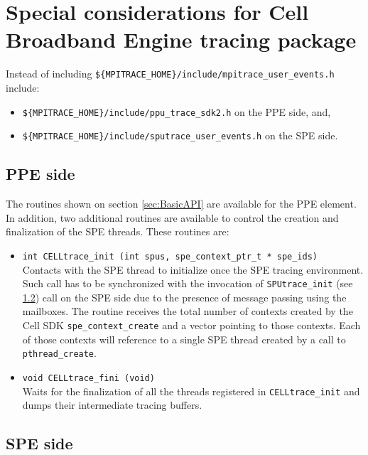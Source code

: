 \section{Special considerations for Cell Broadband Engine tracing package}

Instead of including {\tt \$\{MPITRACE\_HOME\}/include/mpitrace\_user\_events.h} include:
\begin{itemize}
 \item {\tt \$\{MPITRACE\_HOME\}/include/ppu\_trace\_sdk2.h} on the PPE side, and,
 \item {\tt \$\{MPITRACE\_HOME\}/include/sputrace\_user\_events.h} on the SPE side.
\end{itemize}

\subsection{PPE side}\label{subsec:PPEside}

The routines shown on section \ref{sec:BasicAPI} are available for the PPE element. In addition, two additional routines are available to control the creation and finalization of the SPE threads. These routines are:

\begin{itemize}

 \item {\tt int  CELLtrace\_init (int spus, spe\_context\_ptr\_t * spe\_ids)}\\
 Contacts with the SPE thread to initialize once the SPE tracing environment. Such call has to be synchronized with the invocation of {\tt SPUtrace\_init} (see \ref{subsec:SPEside}) call on the SPE side due to the presence of message passing using the mailboxes. The routine receives the total number of contexts created by the Cell SDK {\tt spe\_context\_create} and a vector pointing to those contexts. Each of those contexts will reference to a single SPE thread created by a call to {\tt pthread\_create}.

 \item {\tt void CELLtrace\_fini (void)}\\
 Waits for the finalization of all the threads registered in {\tt CELLtrace\_init} and dumps their intermediate tracing buffers.

\end{itemize}

\subsection{SPE side}\label{subsec:SPEside}

